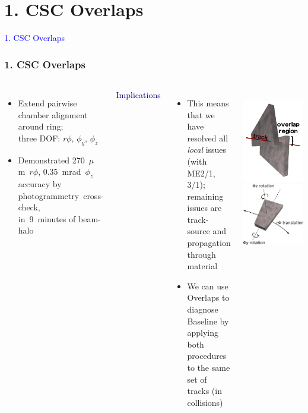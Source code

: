 \documentclass[compress]{beamer}
\begin{document}
\section*{1. CSC Overlaps}
\begin{frame}
\begin{center}
\Huge \textcolor{blue}{1. CSC Overlaps}
\end{center}
\end{frame}

\begin{frame}
\frametitle{1. CSC Overlaps}
\vspace{0.2 cm}
\begin{columns}
\vspace{-0.5 cm}
\begin{itemize}
\item Extend pairwise chamber alignment around ring; \\ three DOF: $r\phi$, $\phi_y$, $\phi_z$
\item Demonstrated 270~$\mu$m~$r\phi$, 0.35~mrad~$\phi_z$ accuracy by \mbox{photogrammetry cross-check,\hspace{-1 cm}} \\ in~9~minutes of beam-halo
\end{itemize}

\vspace{0.2 cm}
\textcolor{darkblue}{\large Implications}

\vspace{-0.1 cm}
\begin{itemize}
\item This means that we have resolved all {\it local} issues \\ (with ME2/1, 3/1); remaining issues are track-source and propagation through material
\item We can use Overlaps to diagnose Baseline by applying both procedures to the same set of tracks (in collisions)
\end{itemize}

\mbox{ } \hfill \includegraphics[width=0.3\linewidth]{overlaps.png} \hfill \includegraphics[width=0.4\linewidth]{csc_coordinates.pdf} \hfill \mbox{ }


\end{columns}
\end{frame}
\end{document}
